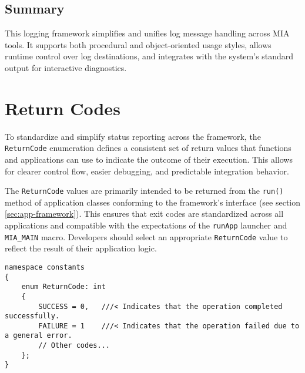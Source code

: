 \subsection{Summary}
This logging framework simplifies and unifies log message handling across MIA tools. It supports both procedural and object-oriented usage styles, allows runtime control over log destinations, and integrates with the system's standard output for interactive diagnostics.
































\section{Return Codes}
\label{sec:return-codes}

To standardize and simplify status reporting across the framework, the \texttt{ReturnCode} enumeration defines a consistent set of return values that functions and applications can use to indicate the outcome of their execution. This allows for clearer control flow, easier debugging, and predictable integration behavior.

The \texttt{ReturnCode} values are primarily intended to be returned from the \texttt{run()} method of application classes conforming to the framework's interface (see section \ref{sec:app-framework}). This ensures that exit codes are standardized across all applications and compatible with the expectations of the \texttt{runApp} launcher and \texttt{MIA\_MAIN} macro. Developers should select an appropriate \texttt{ReturnCode} value to reflect the result of their application logic.

\begin{lstlisting}[style=cppstyle]
namespace constants
{
	enum ReturnCode: int
	{
		SUCCESS = 0,   ///< Indicates that the operation completed successfully.
		FAILURE = 1    ///< Indicates that the operation failed due to a general error.
		// Other codes...
	};
}
\end{lstlisting}

